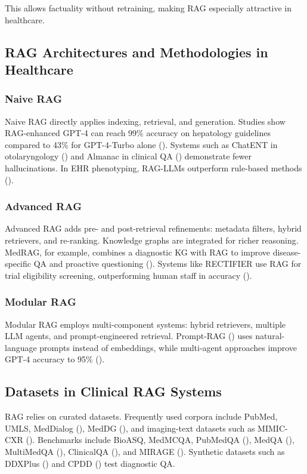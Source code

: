 This allows factuality without retraining, making RAG especially attractive in healthcare.

\subsection{RAG Architectures and Methodologies in Healthcare}

\subsubsection{Naive RAG}
Naive RAG directly applies indexing, retrieval, and generation. Studies show RAG-enhanced GPT-4 can reach 99\% accuracy on hepatology guidelines compared to 43\% for GPT-4-Turbo alone (\citep{li2024liversa}). Systems such as ChatENT in otolaryngology (\citep{zhang2024chatent}) and Almanac in clinical QA (\citep{singhal2023almanac}) demonstrate fewer hallucinations. In EHR phenotyping, RAG-LLMs outperform rule-based methods (\citep{wu2024ragphenotype}).

\subsubsection{Advanced RAG}
Advanced RAG adds pre- and post-retrieval refinements: metadata filters, hybrid retrievers, and re-ranking. Knowledge graphs are integrated for richer reasoning. MedRAG, for example, combines a diagnostic KG with RAG to improve disease-specific QA and proactive questioning (\citep{zhao2025medrag}). Systems like RECTIFIER use RAG for trial eligibility screening, outperforming human staff in accuracy (\citep{wang2024rectifier}).

\subsubsection{Modular RAG}
Modular RAG employs multi-component systems: hybrid retrievers, multiple LLM agents, and prompt-engineered retrieval. Prompt-RAG (\citep{kim2024promptrag}) uses natural-language prompts instead of embeddings, while multi-agent approaches improve GPT-4 accuracy to 95\% (\citep{sun2025agenticrag}).

\subsection{Datasets in Clinical RAG Systems}

RAG relies on curated datasets. Frequently used corpora include PubMed, UMLS, MedDialog (\citep{chen2020meddialog}), MedDG (\citep{li2020meddg}), and imaging-text datasets such as MIMIC-CXR (\citep{johnson2019mimiccxr}). Benchmarks include BioASQ, MedMCQA, PubMedQA (\citep{jin2019pubmedqa}), MedQA (\citep{jin2021medqa}), MultiMedQA (\citep{singhal2023multimedqa}), ClinicalQA (\citep{abacha2021nlmclinicalqa}), and MIRAGE (\citep{zhu2023mirage}). Synthetic datasets such as DDXPlus (\citep{liu2023ddxplus}) and CPDD (\citep{zhao2025medrag}) test diagnostic QA.

